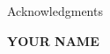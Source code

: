 \begin{center}
\LARGE{Acknowledgments} 
\end{center}

\vspace{0.5in}

\lipsum[1]

\vspace{1.5in}

{\bfseries YOUR NAME}
